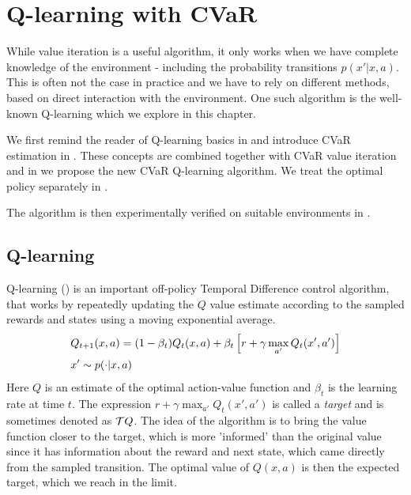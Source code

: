 \chapter{Q-learning with CVaR}\label{ch:qlearning}

While value iteration is a useful algorithm, it only works when we have complete knowledge of the environment - including the probability transitions $p(x'|x,a)$. This is often not the case in practice and we have to rely on different methods, based on direct interaction with the environment. One such algorithm is the well-known Q-learning which we explore in this chapter.

We first remind the reader of Q-learning basics in  and introduce CVaR estimation in . These concepts are combined together with CVaR value iteration and in  we propose the new CVaR Q-learning algorithm. We treat the optimal policy separately in .

The algorithm is then experimentally verified on suitable environments in .

\section{Q-learning}\label{sec:qlearning}

Q-learning (\citet{watkins1992q}) is an important off-policy Temporal Difference control algorithm, that works by repeatedly updating the $Q$ value estimate according to the sampled rewards and states using a moving exponential average.
\begin{equation}
\begin{split}
&Q_{t+1}(x, a) = (1-\beta_t)Q_{t}(x, a) + \beta_t\left[ {r + \gamma \max_{a'} Q_t(x', a')} \right]\\
&x' \sim p(\cdot|x, a)
\end{split}
\end{equation}
Here $Q$ is an estimate of the optimal action-value function  and $\beta_t$ is the learning rate at time $t$. The expression $r + \gamma \max_{a'} Q_t(x', a')$ is called a \textit{target} and is sometimes denoted as $\mathcal{T} Q$. The idea of the algorithm is to bring the value function closer to the target, which is more 'informed' than the original value since it has information about the reward and next state, which came directly from the sampled transition. The optimal value of $Q(x, a)$ is then the expected target, which we reach in the limit.

